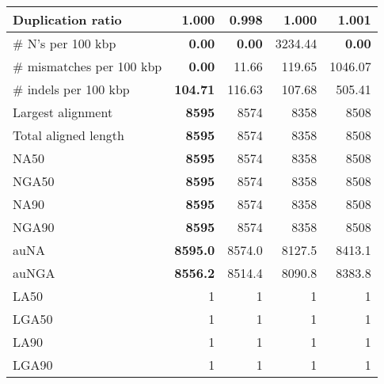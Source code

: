 \documentclass[12pt,a4paper]{article}
\begin{document}
\begin{table}[ht]
\begin{center}
\begin{tabular}{|l*{4}{|r}|}
Duplication ratio & 1.000 & {\bf 0.998} & 1.000 & 1.001 \\ \hline
\# N's per 100 kbp & {\bf 0.00} & {\bf 0.00} & 3234.44 & {\bf 0.00} \\ \hline
\# mismatches per 100 kbp & {\bf 0.00} & 11.66 & 119.65 & 1046.07 \\ \hline
\# indels per 100 kbp & {\bf 104.71} & 116.63 & 107.68 & 505.41 \\ \hline
Largest alignment & {\bf 8595} & 8574 & 8358 & 8508 \\ \hline
Total aligned length & {\bf 8595} & 8574 & 8358 & 8508 \\ \hline
NA50 & {\bf 8595} & 8574 & 8358 & 8508 \\ \hline
NGA50 & {\bf 8595} & 8574 & 8358 & 8508 \\ \hline
NA90 & {\bf 8595} & 8574 & 8358 & 8508 \\ \hline
NGA90 & {\bf 8595} & 8574 & 8358 & 8508 \\ \hline
auNA & {\bf 8595.0} & 8574.0 & 8127.5 & 8413.1 \\ \hline
auNGA & {\bf 8556.2} & 8514.4 & 8090.8 & 8383.8 \\ \hline
LA50 & 1 & 1 & 1 & 1 \\ \hline
LGA50 & 1 & 1 & 1 & 1 \\ \hline
LA90 & 1 & 1 & 1 & 1 \\ \hline
LGA90 & 1 & 1 & 1 & 1 \\ \hline
\end{tabular}
\end{center}
\end{table}
\end{document}

